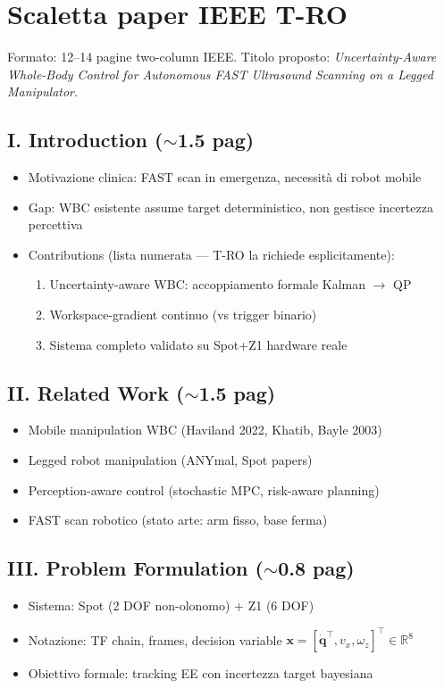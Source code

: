 \documentclass[a4paper,11pt]{article}
\begin{document}
\section{Scaletta paper IEEE T-RO}

Formato: 12--14 pagine two-column IEEE\@.
Titolo proposto: \textit{Uncertainty-Aware Whole-Body Control for Autonomous
FAST Ultrasound Scanning on a Legged Manipulator}.

\subsection*{I. Introduction ($\sim$1.5 pag)}
\begin{itemize}
  \item Motivazione clinica: FAST scan in emergenza, necessità di robot mobile
  \item Gap: WBC esistente assume target deterministico, non gestisce incertezza percettiva
  \item Contributions (lista numerata — T-RO la richiede esplicitamente):
    \begin{enumerate}
      \item Uncertainty-aware WBC: accoppiamento formale Kalman $\to$ QP
      \item Workspace-gradient continuo (vs trigger binario)
      \item Sistema completo validato su Spot+Z1 hardware reale
    \end{enumerate}
\end{itemize}

\subsection*{II. Related Work ($\sim$1.5 pag)}
\begin{itemize}
  \item Mobile manipulation WBC (Haviland 2022, Khatib, Bayle 2003)
  \item Legged robot manipulation (ANYmal, Spot papers)
  \item Perception-aware control (stochastic MPC, risk-aware planning)
  \item FAST scan robotico (stato arte: arm fisso, base ferma)
\end{itemize}

\subsection*{III. Problem Formulation ($\sim$0.8 pag)}
\begin{itemize}
  \item Sistema: Spot (2 DOF non-olonomo) + Z1 (6 DOF)
  \item Notazione: TF chain, frames, decision variable
        $\mathbf{x} = [\dot{\mathbf{q}}^\top, v_x, \omega_z]^\top \in \mathbb{R}^8$
  \item Obiettivo formale: tracking EE con incertezza target bayesiana
\end{itemize}
\end{document}
